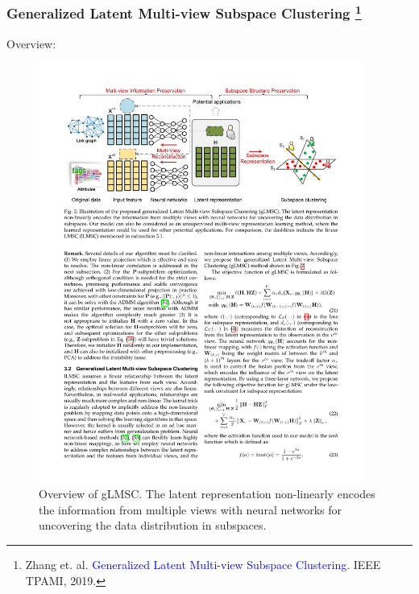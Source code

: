 \documentclass[notheorems, aspectratio=54]{beamer}
\begin{document}
\begin{frame} \frametitle{Generalized Latent Multi-view Subspace Clustering \footnote{Zhang et. al. \textcolor{blue}{Generalized Latent Multi-view Subspace Clustering}. IEEE TPAMI, 2019.}}

Overview:

\begin{figure}
\centering
\includegraphics[width=0.95\textwidth]{./fig/overview_glmsc.pdf}
\caption{Overview of gLMSC. The latent representation non-linearly encodes the information from multiple views with neural networks for uncovering the data distribution in subspaces.}
\label{fig:overview_lmsc}
\end{figure}

\end{frame}
\end{document}
